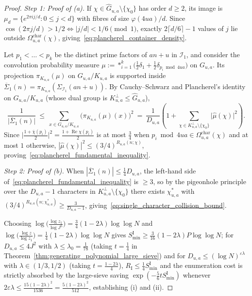 \documentclass[11pt, a4paper]{article}
\theoremstyle{plain}
\theoremstyle{definition}
\begin{document}
\begin{proof}
\emph{Step 1: Proof of (a).}
If $\chi\in\widehat{G}_{u,a}\setminus\{\chi_0\}$ has order $d\ge2$, its image is $\mu_d=\{e^{2\pi ij/d}:0\le j<d\}$ with fibres of size $\varphi(4ua)/d$. Since $\cos(2\pi j/d)>1/2\iff|j/d|<1/6\pmod 1$, exactly $2\lceil d/6\rceil-1$ values of $j$ lie outside $\Omega_{u,a}^{\mathrm{char}}(\chi)$, giving~\eqref{eq:plancherel_container_density}. 

Let $p_1<\dots<p_k$ be the distinct prime factors of $an+u$ in $\mathcal{I}_1$, and consider the convolution probability measure $\mu:=\ast_{i=1}^{k}\big(\frac12\delta_1+\frac12\delta_{p_i\bmod 4ua}\big)$ on $G_{u,a}$. Its projection $\pi_{K_{u,a}}(\mu)$ on $G_{u,a}/K_{u,a}$ is supported inside $\overline{\Sigma}_1(n)=\pi_{K_{u,a}}(\Sigma_{\mathcal{I}_1}(an+u))$. By Cauchy--Schwarz and Plancherel's identity on $G_{u,a}/K_{u,a}$ (whose dual group is $K_{u,a}^{\perp}\le\widehat{G}_{u,a}$),
\[
\frac{1}{\big|\overline{\Sigma}_1(n)\big|}\ \le\ \sum_{x\in G_{u,a}/K_{u,a}}\big(\pi_{K_{u,a}}(\mu)(x)\big)^{2}\ =\ \frac{1}{D_{u,a}}\left(1+\sum_{\chi\in K_{u,a}^{\perp}\setminus\{\chi_0\}}\big|\widehat{\mu}(\chi)\big|^{2}\right).
\]
Since $\big|\frac{1+\overline{\chi}(p_i)}{2}\big|^{2}=\frac{1+\operatorname{Re}\chi(p_i)}{2}$ is at most $\frac34$ when $p_i\bmod 4ua\in\Omega_{u,a}^{\mathrm{char}}(\chi)$ and at most $1$ otherwise, $|\widehat{\mu}(\chi)|^{2}\le(3/4)^{R_{u,a}(n;\chi)}$, proving~\eqref{eq:plancherel_fundamental_inequality}.

\medskip\noindent\emph{Step 2: Proof of (b).}
When $|\overline{\Sigma}_1(n)|\le\frac14 D_{u,a}$, the left-hand side of~\eqref{eq:plancherel_fundamental_inequality} is $\ge3$, so by the pigeonhole principle over the $D_{u,a}-1$ characters in $K_{u,a}^{\perp}\setminus\{\chi_0\}$ there exists $\chi_{u,a}^{\ast}$ with $(3/4)^{R_{u,a}(n;\chi_{u,a}^{\ast})}\ge\frac{3}{D_{u,a}-1}$, giving~\eqref{eq:single_character_collision_bound}. 

Choosing $\log\big(\frac{\log z_1}{\log J^{5}}\big)=\allowbreak\frac34(1-2\lambda)\log\log N$ and $\log\big(\frac{\log z}{\log z_1}\big)=\allowbreak\frac14(1-2\lambda)\log\log N$ gives $S_{\min}^{\mathrm{I}}\ge\allowbreak\frac{3}{16}(1-2\lambda)P\log\log N$; for $D_{u,a}\le 4J^{2}$ with $\lambda\le\lambda_0=\frac{1}{78}$ (taking $t=\frac14$ in Theorem~\ref{thm:generating_polynomial_large_sieve}) and for $D_{u,a}\le(\log N)^{\varepsilon\lambda}$ with $\lambda\in(1/3,1/2)$ (taking $t=\frac{1-2\lambda}{4}$), $R_{\mathrm{I}}\le\frac14 S_{\min}^{\mathrm{I}}$ and the enumeration cost is strictly absorbed by the large-sieve saving $\exp(-\frac56 tS_{\min}^{\mathrm{I}})$ whenever $2\varepsilon\lambda\le\frac{15(1-2\lambda)^{2}}{1536}=\frac{5(1-2\lambda)^{2}}{512}$, establishing (i) and (ii).


\end{proof}
\end{document}
